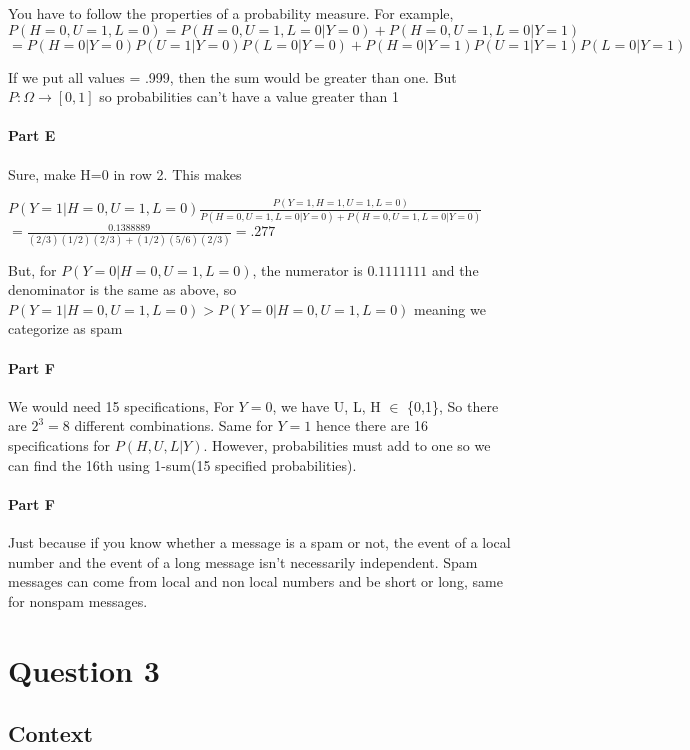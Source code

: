 \documentclass[11pt]{article}
\begin{document}
You have to follow the properties of a probability measure. For example,
\(P(H=0, U=1, L=0) = P(H=0, U=1, L=0|Y=0) + P(H=0, U=1, L=0|Y=1)\)
\(= P(H=0|Y=0)P(U=1|Y=0)P(L=0|Y=0) + P(H=0|Y=1)P(U=1|Y=1)P(L=0|Y=1)\)

If we put all values = .999, then the sum would be greater than one. But
\(P:\Omega \to [0,1]\) so probabilities can't have a value greater than
1

    \paragraph{Part E}\label{part-e}

Sure, make H=0 in row 2. This makes

\(P(Y=1|H=0, U=1, L=0) \frac{P(Y=1, H=1, U=1, L=0)}{P(H=0, U=1, L=0|Y=0) + P(H=0, U=1, L=0|Y=0)}\)
\(= \frac{0.1388889} {(2/3)(1/2)(2/3) + (1/2)(5/6)(2/3)} = .277\)

But, for \(P(Y=0|H=0, U=1, L=0)\), the numerator is \(0.1111111\) and
the denominator is the same as above, so
\(P(Y=1|H=0, U=1, L=0) > P(Y=0|H=0, U=1, L=0)\) meaning we categorize as
spam

    \paragraph{Part F}\label{part-f}

We would need 15 specifications, For \(Y = 0\), we have U, L, H \(\in\)
\{0,1\}, So there are \(2^3 = 8\) different combinations. Same for
\(Y = 1\) hence there are 16 specifications for \(P(H, U, L| Y)\).
However, probabilities must add to one so we can find the 16th using
1-sum(15 specified probabilities).

    \paragraph{Part F}\label{part-f}

Just because if you know whether a message is a spam or not, the event
of a local number and the event of a long message isn't necessarily
independent. Spam messages can come from local and non local numbers and
be short or long, same for nonspam messages.

    \section{Question 3}\label{question-3}

    \subsection{Context}\label{context}
\end{document}
